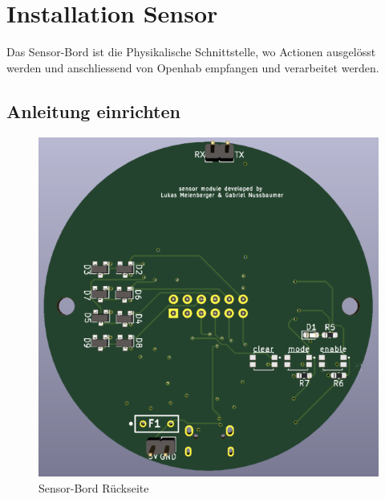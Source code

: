 \clearpage
\section{Installation Sensor}\label{sec:Sensor}

Das Sensor-Bord ist die Physikalische Schnittstelle, wo Actionen ausgelösst werden und anschliessend von Openhab empfangen und verarbeitet werden.
\subsection{Anleitung einrichten}
\begin{figure}[H]
	\begin{center}
		\begin{minipage}[b]{.3\linewidth} %
			\includegraphics[width=\textwidth]{graphics/Sensor1.PNG}
			\caption{Sensor-Bord Rückseite}
			\label{pic: Sensorbord}
		\end{minipage}
		\hspace{.1\linewidth}%
		\begin{minipage}[b]{.3\linewidth} %

\end{minipage}
\end{center}
\end{figure}
